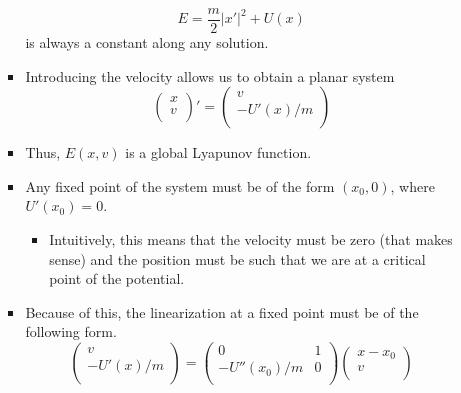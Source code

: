 \documentclass[../notes.tex]{subfiles}
\begin{document}
\begin{itemize}
\begin{itemize}
\begin{itemize}
\begin{equation*}
                E = \frac{m}{2}|x'|^2+U(x)
            \end{equation*}
            is always a constant along any solution.
            \item Introducing the velocity allows us to obtain a planar system
            \begin{equation*}
                \begin{pmatrix}
                    x\\
                    v\\
                \end{pmatrix}'
                =
                \begin{pmatrix}
                    v\\
                    -U'(x)/m\\
                \end{pmatrix}
            \end{equation*}
            \item Thus, $E(x,v)$ is a global Lyapunov function.
            \item Any fixed point of the system must be of the form $(x_0,0)$, where $U'(x_0)=0$.
            \begin{itemize}
                \item Intuitively, this means that the velocity must be zero (that makes sense) and the position must be such that we are at a critical point of the potential.
            \end{itemize}
            \item Because of this, the linearization at a fixed point must be of the following form.
            \begin{equation*}
                \begin{pmatrix}
                    v\\
                    -U'(x)/m\\
                \end{pmatrix}
                =
                \begin{pmatrix}
                    0 & 1\\
                    -U''(x_0)/m & 0\\
                \end{pmatrix}
                \begin{pmatrix}
                    x-x_0\\
                    v\\
                \end{pmatrix}

\end{equation*}
\end{itemize}
\end{itemize}
\end{itemize}
\end{document}
